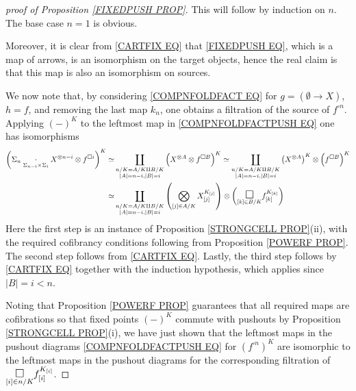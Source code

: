 \documentclass[a4paper,10pt
,draft
]{article}%
\numberwithin{equation}{section}
\numberwithin{figure}{section}
\theoremstyle{definition} %
\newcommand{\1}{\ensuremath{\mathbbm 1}}%
\begin{document}
\begin{proof}[proof of Proposition \ref{FIXEDPUSH PROP}]
This will follow by induction on $n$. The base case $n=1$ is obvious.

Moreover, it is clear from \eqref{CARTFIX EQ} that \eqref{FIXEDPUSH EQ}, which is a map of arrows, is an isomorphism on the target objects, hence the real claim is that this map is also an isomorphism on sources.

We now note that, 
by considering \eqref{COMPNFOLDFACT EQ} for
$g= (\emptyset \to X)$, $h=f$,
and removing the last map $k_n$,
one obtains a filtration of the source of $f^{\square n}$.
Applying $(\minus)^K$ to the leftmost map in 
\eqref{COMPNFOLDFACTPUSH EQ}
one has isomorphisms
\begin{align*}
	\left(
	\Sigma_n \underset{\Sigma_{n-i} \times \Sigma_i}
	{\cdot} X^{\otimes n-i} \otimes f^{\square i}
	\right)^K
\simeq &
	\coprod_{\substack{n/K=A/K \amalg B/K \\
	|A|=n-i,|B|=i}}
	\left( X^{\otimes A} \otimes f^{\square B} \right)^K
\simeq
	\coprod_{\substack{n/K=A/K \amalg B/K \\
	|A|=n-i,|B|=i}} 
	\left( X^{\otimes A}\right)^K \otimes \left( f^{\square B} \right)^K
\\
\simeq &
	\coprod_{\substack{n/K=A/K \amalg B/K \\
	|A|=n-i,|B|=i}} 
	\left(
	\bigotimes_{[j]\in A/K} X_{[j]}^{K_{[j]}}
	\right)
\otimes 
	\left(
	\underset{[k] \in B/K}
	{\mathlarger{\mathlarger{\square}}}
	f_{[k]}^{K_{[k]}}
	\right)
\end{align*}
Here the first step is an instance of Proposition \ref{STRONGCELL PROP}(ii),
with the required cofibrancy conditions following from Proposition \ref{POWERF PROP}. The second step follows from \eqref{CARTFIX EQ}.
Lastly, the third step follows by
\eqref{CARTFIX EQ} together with the induction hypothesis, which applies since $|B|=i<n$.

Noting that Proposition \ref{POWERF PROP} guarantees that all required maps are cofibrations
so that fixed points $(\minus)^K$ commute with pushouts by Proposition \ref{STRONGCELL PROP}(i),
we have just shown that 
the leftmost maps in the pushout diagrams \eqref{COMPNFOLDFACTPUSH EQ} for 
$\left( f^{\square n} \right)^K$
are isomorphic to the leftmost maps in the pushout diagrams for the corresponding filtration of 	
$\underset{[i] \in n/K}{\mathlarger{\mathlarger{\square}}}
 f_{[i]}^{K_{[i]}}$.
\end{proof}
\end{document}
